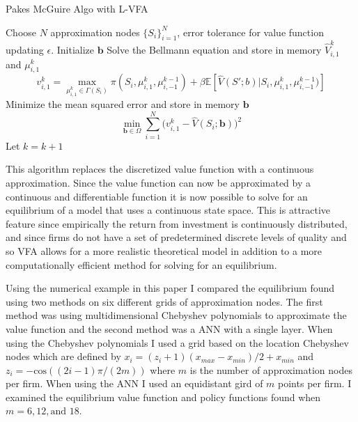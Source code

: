 \documentclass[12pt]{article}
\newcommand{\norm}[1]{\left\lVert#1\right\rVert}
\begin{document}
\begin{algorithm}[H]
  \caption{Pakes McGuire Algo with L-VFA}
  \begin{algorithmic}[1]
    \Procedure{}{} Choose $N$ approximation nodes $\{S_i\}_{i=1}^N$, error tolerance for value function updating $\epsilon$.
    \State Initialize $\boldsymbol{b}$
    \While{$\norm{\hat{V}^{k}_1-\hat{V}^{k-1}_1} > \frac{\epsilon (1-\beta)}{2\beta}$}
    \State Solve the Bellmann equation and store in memory $\hat{V}^k_{i,1}$ and $\mu^k_{i,1}$
    \begin{equation*}
      v^k_{i,1}=\max_{\mu^k_{i,1} \in \Gamma(S_i)} \pi(S_i, \mu^k_{i,1}, \mu^{k-1}_{i,-1})+ \beta\mathbb{E}[\hat{V}(S';b)|S_i,\mu^k_{i,1},\mu^{k-1}_{i,-1})]
    \end{equation*}
    \State Minimize the mean squared error and store in memory $\boldsymbol{b}$
    \begin{equation*}
      \min_{\boldsymbol{b} \in \Omega} \sum_{i=1}^N \bigg ( v^k_{i,1} - \hat{V}(S_i;\boldsymbol{b}) \bigg)^2
    \end{equation*}
    \State Let $k=k+1$
    \EndFor
    \EndWhile
    \EndProcedure
  \end{algorithmic}
\end{algorithm}

This algorithm replaces the discretized value function with a continuous approximation. Since the value function can now be approximated by a continuous and differentiable function it is now possible to solve for an equilibrium of a model that uses a continuous state space. This is attractive feature since empirically the return from investment is continuously distributed, and since firms do not have a set of predetermined discrete levels of quality and so VFA allows for a more realistic theoretical model in addition to a more computationally efficient method for solving for an equilibrium.

Using the numerical example in this paper I compared the equilibrium found using two methods on six different grids of approximation nodes. The first method was using multidimensional Chebyshev polynomials to approximate the value function and the second method was a ANN with a single layer. When using the Chebyshev polynomials I used a grid based on the location Chebyshev nodes which are defined by $x_i=(z_i+1)(x_{max}-x_{min})/2+x_{min}$ and $z_i=-\text{cos}((2i-1)\pi/(2m))$ where $m$ is the number of approximation nodes per firm. When using the ANN I used an equidistant gird of $m$ points per firm. I examined the equilibrium value function and policy functions found when $m=6,12,\text{and }18$.
\end{document}
